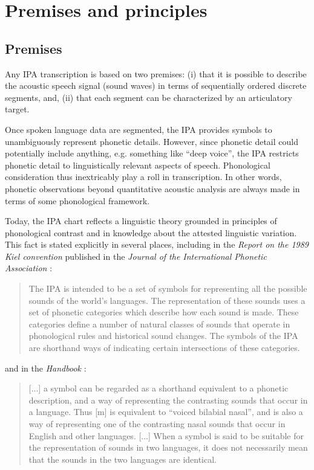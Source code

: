 
\section{Premises and principles}
\label{IPApremises-principles}
\subsection*{Premises}
\label{IPApremises}

Any IPA transcription is based on two premises: (i) that it is possible to
describe the acoustic speech signal (sound waves) in terms of sequentially
ordered discrete segments, and, (ii) that each segment can be characterized by
an articulatory target.

Once spoken language data are segmented, the IPA provides symbols to
unambiguously represent phonetic details. However, since phonetic detail could
potentially include anything, e.g. something like ``deep voice'', the IPA
restricts phonetic detail to linguistically relevant aspects of speech.
Phonological consideration thus inextricably play a roll in transcription. In
other words, phonetic observations beyond quantitative acoustic analysis are
always made in terms of some phonological framework.

Today, the IPA chart reflects a linguistic theory grounded in principles of
phonological contrast and in knowledge about the attested linguistic variation.
This fact is stated explicitly in several places, including in the
\textit{Report on the 1989 Kiel convention} published in the \textit{Journal of
the International Phonetic Association} \citep[67-68]{International1989report}:

\begin{quote}
The IPA is intended to be a set of symbols for representing all the possible 
sounds of the world's languages. The representation of these sounds uses a set 
of phonetic categories which describe how each sound is made. These categories 
define a number of natural classes of sounds that operate in phonological rules 
and historical sound changes. The symbols of the IPA are shorthand ways of 
indicating certain intersections of these categories.
\end{quote}

\noindent and in the \textit{Handbook} \citep[18]{IPA1999}: 

\begin{quote}
[...] a symbol can be regarded as a shorthand equivalent to a phonetic
description, and a way of representing the contrasting sounds that occur in a
language. Thus [m] is equivalent to ``voiced bilabial nasal'', and is also a way
of representing one of the contrasting nasal sounds that occur in English and
other languages. [...] When a symbol is said to be suitable for the
representation of sounds in two languages, it does not necessarily mean that the
sounds in the two languages are identical.
\end{quote}


